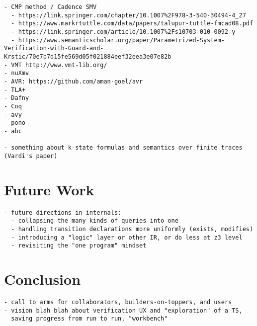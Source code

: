 \begin{verbatim}
- CMP method / Cadence SMV
  - https://link.springer.com/chapter/10.1007%2F978-3-540-30494-4_27
  - https://www.markrtuttle.com/data/papers/talupur-tuttle-fmcad08.pdf
  - https://link.springer.com/article/10.1007%2Fs10703-010-0092-y
  - https://www.semanticscholar.org/paper/Parametrized-System-Verification-with-Guard-and-Krstic/70e7b7d15fe569d05f021884eef32eea3e07e82b
- VMT http://www.vmt-lib.org/
- nuXmv
- AVR: https://github.com/aman-goel/avr
- TLA+
- Dafny
- Coq
- avy
- pono
- abc

- something about k-state formulas and semantics over finite traces (Vardi's paper)
\end{verbatim}

\section{Future Work}

\begin{verbatim}
- future directions in internals:
  - collapsing the many kinds of queries into one
  - handling transition declarations more uniformly (exists, modifies)
  - introducing a "logic" layer or other IR, or do less at z3 level
  - revisiting the "one program" mindset
\end{verbatim}

\section{Conclusion}

\begin{verbatim}
- call to arms for collaborators, builders-on-toppers, and users
- vision blah blah about verification UX and "exploration" of a TS,
  saving progress from run to run, "workbench"
\end{verbatim}